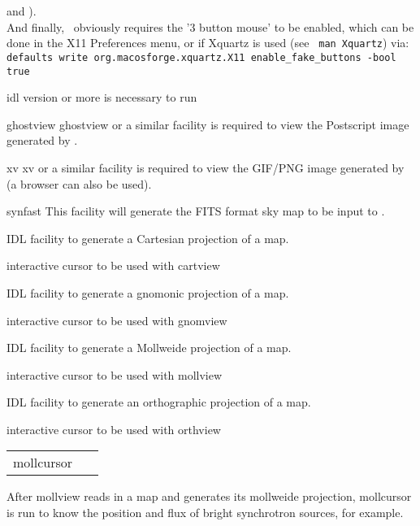 \begin{codedescription}
{%
and ). \\
And finally, \thedocid\ obviously requires the '3 button mouse' to be enabled,
which can be done in the X11 Preferences menu, or if Xquartz is used (see {\tt
man Xquartz}) via:\\
{\footnotesize {\tt defaults write org.macosforge.xquartz.X11 enable\_fake\_buttons
-bool true}}
}
\end{codedescription}




\begin{related}
  \begin{sulist}{} %
  \item[idl] version \idlversion or more is necessary to run \thedocid
  \item[ghostview] ghostview or a similar facility is required to view
	  the Postscript image generated by \thedocid.
  \item[xv] xv or a similar facility is required to view the
            GIF/PNG image generated by \thedocid  (a browser can also 
            be used).
  \item[synfast] This \healpix facility will generate the FITS format 
            sky map to be input to \thedocid.
  \item[{\htmlref{cartview}{idl:cartview}}] 
	IDL facility to generate a Cartesian projection of
  	a \healpix map.
  \item[{\htmlref{cartcursor}{idl:cartcursor}}] 
	interactive cursor to be used with cartview
  \item[{\htmlref{gnomview}{idl:gnomview}}] 
	IDL facility to generate a gnomonic projection of
  	a \healpix map.
  \item[{\htmlref{gnomcursor}{idl:gnomcursor}}] 
	interactive cursor to be used with gnomview
  \item[{\htmlref{mollview}{idl:mollview}}] 
	IDL facility to generate a Mollweide projection of
  	a \healpix map.
  \item[{\htmlref{mollcursor}{idl:mollcursor}}] interactive cursor to be used with mollview
  \item[{\htmlref{orthview}{idl:orthview}}] 
	IDL facility to generate an orthographic projection of
  	a \healpix map.
  \item[{\htmlref{orthcursor}{idl:orthcursor}}] 
	interactive cursor to be used with orthview
  \end{sulist}
\end{related}

\begin{example}
{
\begin{tabular}{ll} %
mollcursor & \ 
\end{tabular}
}
{After mollview reads in a map and generates
its mollweide projection, mollcursor is run to know the
position and flux of bright synchrotron sources, for example.}
\end{example}


